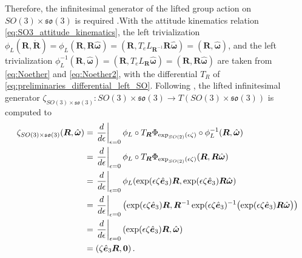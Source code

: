 Therefore, the infinitesimal generator of the lifted group action on $SO(3)\times\mathfrak{so}(3)$ is required \cite{Lee2008}.With the attitude kinematics relation \eqref{eq:SO3_attitude_kinematics}, the left trivialization $\phi_L(\bm{R},\dot{\bm{R}})=\phi_L(\bm{R},\bm{R}\hat{\bm{\omega}})=(\bm{R},T_eL_{\bm{R}^{-1}}\bm{R}\hat{\bm{\omega}})=(\bm{R},\hat{\bm{\omega}})$, and the left trivialization $\phi_L^{-1}(\bm{R},\hat{\bm{\omega}})=(\bm{R},T_eL_{\bm{R}}\hat{\bm{\omega}})=(\bm{R},\bm{R}\hat{\bm{\omega}})$ are taken from \eqref{eq:Noether} and \eqref{eq:Noether2}, with the differential $T_R$ of \eqref{eq:preliminaries_differential_left_SO}. Following \cite{Lee2008}, the lifted infinitesimal generator $\zeta_{SO(3) \times \mathfrak{so}(3)}:SO(3) \times \mathfrak{so}(3) \to T(SO(3) \times \mathfrak{so}(3))$ is computed to
\begin{align}
\zeta_{SO(3)\times\mathfrak{so}(3)}(\bm{R},\hat{\bm{\omega}})
&=
\left.\frac{d}{d\epsilon}\right|_{\epsilon=0}
\phi_L \circ T_{\bm R}\Phi_{\exp_{SO(2)}(\epsilon\zeta)}
\circ \phi_L^{-1}(\bm{R},\hat{\bm{\omega}}) \notag\\
&=
\left.\frac{d}{d\epsilon}\right|_{\epsilon=0}
\phi_L \circ T_{\bm R}\Phi_{\exp_{SO(2)}(\epsilon\zeta)}
(\bm{R},\bm{R}\hat{\bm{\omega}}) \notag\\
&=
\left.\frac{d}{d\epsilon}\right|_{\epsilon=0}
\phi_L\!\left(
\exp(\epsilon\zeta\hat{\bm e}_3)\bm{R},
\exp(\epsilon\zeta\hat{\bm e}_3)\bm{R}\hat{\bm{\omega}}
\right) \notag\\
&=
\left.\frac{d}{d\epsilon}\right|_{\epsilon=0}
\left(
\exp(\epsilon\zeta\hat{\bm e}_3)\bm{R},
\bm{R}^{-1}\exp(\epsilon\zeta\hat{\bm e}_3)^{-1}
\bigl(\exp(\epsilon\zeta\hat{\bm e}_3)\bm{R}\hat{\bm{\omega}}\bigr)
\right) \notag\\
&=
\left.\frac{d}{d\epsilon}\right|_{\epsilon=0}
\left(
\exp(\epsilon\zeta\hat{\bm e}_3)\bm{R},
\hat{\bm{\omega}}
\right) \notag\\
&=
\left(
\zeta\hat{\bm e}_3\bm{R},
\bm{0}
\right).
\label{eq:continuous_3D_pendulum_lifted_generator}
\end{align}

